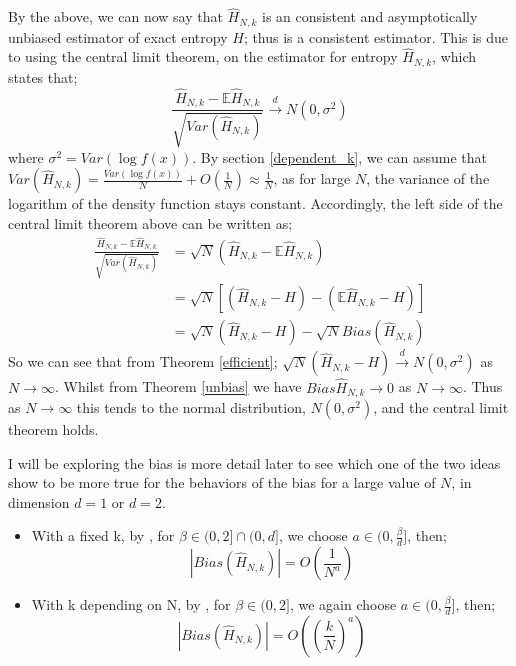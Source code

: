 \documentclass{report}
\begin{document}
By the above, we can now say that $\hat{H}_{N, k}$ is an consistent and asymptotically unbiased estimator of exact entropy $H$; thus is a consistent estimator. This is due to using the central limit theorem, on the estimator for entropy $\hat{H}_{N, k}$, which states that;
\begin{equation}
\frac{\hat{H}_{N, k} - \mathbb{E}{\hat{H}_{N, k}}}{\sqrt{Var(\hat{H}_{N, k})}} \xrightarrow{d} N(0, \sigma^2) \nonumber
\end{equation}
where $\sigma^2 = Var(\log f(x))$. By section \ref{dependent_k}, we can assume that $Var(\hat{H}_{N, k}) = \frac{Var(\log f(x))}{N} + O(\frac{1}{N}) \approx \frac{1}{N}$, as for large $N$, the variance of the logarithm of the density function stays constant. Accordingly, the left side of the central limit theorem above can be written as;
\begin{align*}
\frac{\hat{H}_{N, k} - \mathbb{E}{\hat{H}_{N, k}}}{\sqrt{Var(\hat{H}_{N, k})}} &= \sqrt{N}(\hat{H}_{N, k} - \mathbb{E}{\hat{H}_{N, k}}) \\
&= \sqrt{N}[(\hat{H}_{N, k} - H) - (\mathbb{E}{\hat{H}_{N, k}} - H)] \\
&= \sqrt{N}(\hat{H}_{N, k} - H) - \sqrt{N} Bias(\hat{H}_{N, k})
\end{align*}
So we can see that from Theorem \ref{efficient}; $\sqrt{N}(\hat{H}_{N, k} - H) \xrightarrow{d} N(0, \sigma^2)$ as $N \to \infty$. Whilst from Theorem \ref{unbias} we have $Bias{\hat{H}_{N, k}} \to 0$ as $N \to \infty$. Thus as $N \to \infty$ this tends to the normal distribution, $N(0, \sigma^2)$, and the central limit theorem holds.

I will be exploring the bias is more detail later to see which one of the two ideas show to be more true for the behaviors of the bias for a large value of $N$, in dimension $d=1$ or $d=2$. 
\begin{itemize}
\item With a fixed k, by \cite{paper3}, for $\beta \in (0, 2] \cap (0, d]$, we choose $a \in (0, \frac{\beta}{d} ]$, then;
\begin{equation} \label{fixedkbias}
|Bias(\hat{H}_{N, k})| = O \left( \frac{1}{N^{a}} \right)
\end{equation}

\item With k depending on N, by \cite{paper4}, for $\beta \in (0, 2]$, we again choose $a \in (0, \frac{\beta}{d} ]$, then;
 \begin{equation} \label{dependentkbias}
|Bias(\hat{H}_{N, k})| = O\left( \left( \frac{k}{N} \right)^{a} \right)
\end{equation}


\end{itemize}
\end{document}
